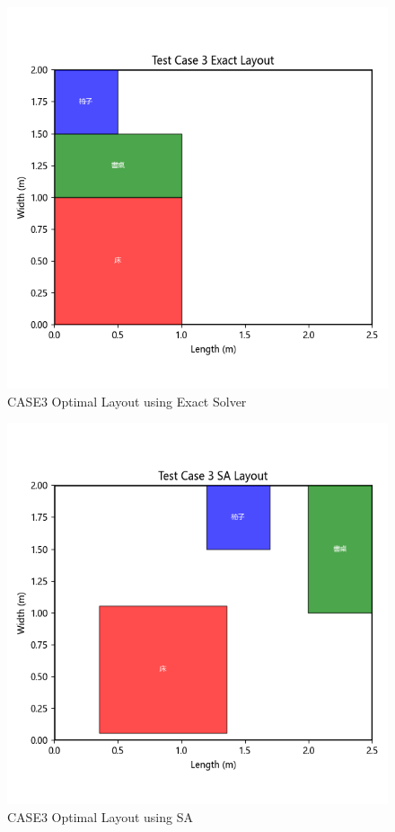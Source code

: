 \documentclass[conference]{IEEEtran}
\begin{document}
\begin{figure}[!htbp]
    \centering
    \includegraphics[width=0.8\columnwidth]{exact_layout_test_case_3.png} 
    \caption{CASE3 Optimal Layout using Exact Solver}
    \label{fig:case3_exact_solver}
\end{figure}

\begin{figure}[!htbp]
    \centering
    \includegraphics[width=0.8\columnwidth]{sa_layout_test_case_3.png} 
    \caption{CASE3 Optimal Layout using SA}
    \label{fig:case3_sa}
\end{figure}
\end{document}
